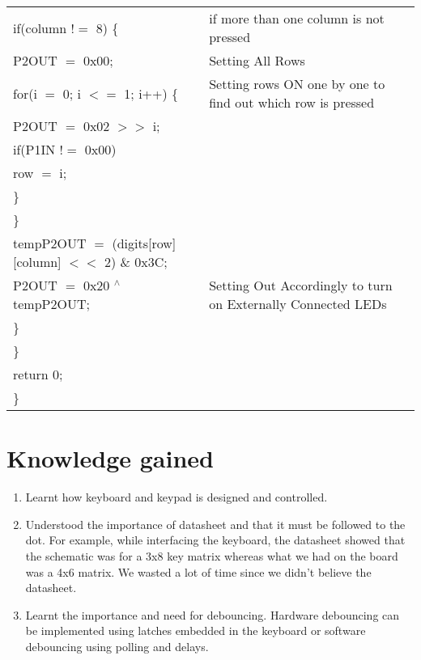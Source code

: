 \documentclass[12pt, letterpaper]{article}
\begin{document}
\begin{longtable}{|p{8cm}||p{6cm}|}
            \hspace{0.3cm}    if(column $!=$ 8) \{  & if more than one column is not pressed \\
            \hspace{0.5cm}     P2OUT $=$ 0x00; & Setting All Rows \\
            \hspace{0.5cm}    for(i $=$ 0; i $<=$ 1; i++) \{ & Setting rows ON one by one to find out which row is pressed\\
            \hspace{0.7cm}    P2OUT $=$ 0x02 $>>$ i; & \\
            \hspace{0.7cm}    if(P1IN $!=$ 0x00) & \\
            \hspace{0.9cm}    row $=$ i;     &  \\
            \hspace{0.7cm}    \} & \\
            \hspace{0.5cm}    \} & \\
            \hspace{0.3cm}    tempP2OUT $=$ (digits[row][column] $<<$ 2) \& 0x3C; & \\
            \hspace{0.3cm}    P2OUT $=$ 0x20 $^\wedge$ tempP2OUT; &  Setting Out Accordingly to turn on Externally Connected LEDs\\
            \hspace{0.3cm}    \} & \\

            \hspace{0.1cm}    \} & \\
            \hspace{0.1cm}     return 0; & \\
            \} & \\

\end{longtable}

\section{Knowledge gained}

\begin{enumerate}
	\item Learnt how keyboard and keypad is designed and controlled.
	
	\item Understood the importance of datasheet and that it must be followed to the dot. For example, while interfacing the keyboard, the datasheet showed that the schematic was for a 3x8 key matrix whereas what we had on the board was a 4x6 matrix. We wasted a lot of time since we didn't believe the datasheet.
	
	\item Learnt the importance and need for debouncing. Hardware debouncing can be implemented using latches embedded in the keyboard or software debouncing using polling and delays. 
	
\end{enumerate}
\end{document}

